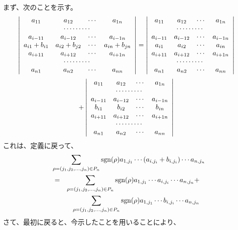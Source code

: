 \begin{enumerate}
\smallskip
\proof
まず、次のことを示す。
$$\left|\begin{array}{cccc}a_{11} & a_{12} & \cdots & a_{1n} \\
\multicolumn{4}{c}{\cdots\cdots\cdots}\\
a_{i-11} & a_{i-12} & \cdots & a_{i-1n}\\
a_{i1}+b_{i1} & a_{i2}+b_{j2} & \cdots & a_{in}+b_{jn}\\
a_{i+11} & a_{i+12} & \cdots & a_{i+1n}\\
\multicolumn{4}{c}{\cdots\cdots\cdots}\\
a_{n1} & a_{n2} & \cdots & a_{nn}
\end{array}\right| = 
\left|\begin{array}{cccc}a_{11} & a_{12} & \cdots & a_{1n} \\
\multicolumn{4}{c}{\cdots\cdots\cdots}\\
a_{i-11} & a_{i-12} & \cdots & a_{i-1n}\\
a_{i1} & a_{i2} & \cdots & a_{in}\\
a_{i+11} & a_{i+12} & \cdots & a_{i+1n}\\
\multicolumn{4}{c}{\cdots\cdots\cdots}\\
a_{n1} & a_{n2} & \cdots & a_{nn}
\end{array}\right| $$
$$+ 
\left|\begin{array}{cccc}a_{11} & a_{12} & \cdots & a_{1n} \\
\multicolumn{4}{c}{\cdots\cdots\cdots}\\
a_{i-11} & a_{i-12} & \cdots & a_{i-1n}\\
b_{i1} & b_{i2} & \cdots & b_{in}\\
a_{i+11} & a_{i+12} & \cdots & a_{i+1n}\\
\multicolumn{4}{c}{\cdots\cdots\cdots}\\
a_{n1} & a_{n2} & \cdots & a_{nn}
\end{array}\right| $$
これは、定義に戻って、
\begin{eqnarray*}
\lefteqn{\sum_{\rho = (j_1,j_2,\ldots,j_n)\in P_n} \sgn(\rho)a_{1,j_1}\cdots (a_{i,j_i} + b_{i,j_i}) \cdots a_{n,j_n}}\\
& = & \sum_{\rho = (j_1,j_2,\ldots,j_n)\in P_n} \sgn(\rho)a_{1,j_1}\cdots a_{i,j_i} \cdots a_{n,j_n} + \\
&  & \mbox{ } \sum_{\rho = (j_1,j_2,\ldots,j_n)\in P_n} \sgn(\rho)a_{1,j_1}\cdots b_{i,j_i} \cdots a_{n,j_n}
\end{eqnarray*}
さて、最初に戻ると、今示したことを用いることにより、
\begin{eqnarray*}

\end{eqnarray*}
\end{enumerate}
